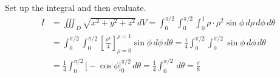\documentclass[a4paper, 12pt]{article}
\begin{document}
\begin{enumerate}[leftmargin=*,label=\textbf{\arabic*.}]
Set up the integral and then evaluate.
\begin{align*}
I&=\iiint_D\sqrt{x^2+y^2+z^2}\,dV=\int_0^{\pi/2}\int_0^{\pi/2}\int_0^1\rho\cdot\rho^2\sin\phi\,d\rho\,d\phi\,d\theta\\[1em]&=\int_0^{\pi/2}\int_0^{\pi/2}\left[\frac{\rho^4}4\right]_{\rho=0}^{\rho=1}\sin\phi\,d\phi\,d\theta=\frac14\int_0^{\pi/2}\int_0^{\pi/2}\sin\phi\,d\phi\,d\theta\\[1em]&=\frac14\int_0^{\pi/2}\bigg[-\cos\phi\bigg]_0^{\pi/2}\,d\theta=\frac14\int_0^{\pi/2}\,d\theta=\boxed{\frac\pi8}
\end{align*}

\end{enumerate}

\newpage
{}
{}


\end{document}
